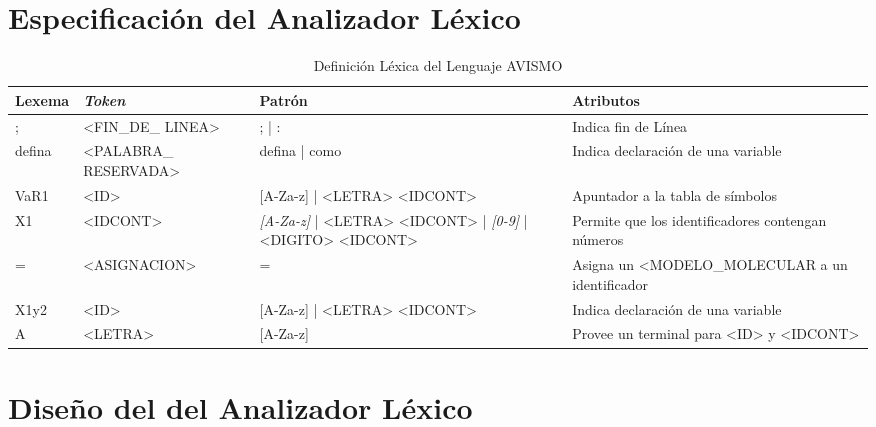 \section{Especificación del Analizador Léxico}

\begin{table}[ht]
    \footnotesize
    \begin{tabularx}{\linewidth}{|X|X|X|X|}
        \hline
        Lexema & \textit{Token}        & Patrón                                                              & Atributos                                          \\\hline
        ;      & <FIN\_DE\_ LINEA>     & ; | :                                                                 & Indica fin de Línea                               \\\hline
        defina & <PALABRA\_ RESERVADA> & defina | como                                                         & Indica declaración de una variable                \\\hline
        VaR1   & <ID>                  & [A-Za-z] | <LETRA> <IDCONT>                                           & Apuntador a la tabla de símbolos                  \\\hline
        X1     & <IDCONT>              & \textit{[A-Za-z]} | <LETRA> <IDCONT> | \textit{[0-9]} | <DIGITO> <IDCONT> & Permite que los identificadores contengan números \\\hline
        =      & <ASIGNACION>          & =                                                                     & Asigna un <MODELO\_MOLECULAR a un identificador   \\\hline
        X1y2   & <ID>                  & [A-Za-z] | <LETRA> <IDCONT>                                           & Indica declaración de una variable                \\\hline
        A      & <LETRA>               & [A-Za-z]                                                              & Provee un terminal para <ID> y <IDCONT>           \\\hline
    \end{tabularx}
    \label{table: lexTable}
    \caption{Definición Léxica del Lenguaje AVISMO}
\end{table}

\section{Diseño del del Analizador Léxico}


